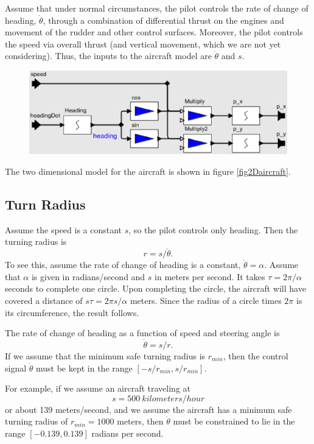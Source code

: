 \documentclass[11pt]{article}
\begin{document}
Assume that under normal circumstances, the pilot controls the rate of
change of heading, $\dot{\theta}$, through a combination of differential
thrust on the engines and movement of the rudder and other control
surfaces. Moreover, the pilot controls the speed via overall thrust
(and vertical movement, which we are not yet considering).
Thus, the inputs to the aircraft model are $\dot{\theta}$ and $s$.

\begin{figure}[btp]
\centering
\includegraphics[width=5in]{fig2Daircraft.eps}
\end{figure}

The two dimensional model for the aircraft is shown in figure
\ref{fig2Daircraft}.

\subsection{Turn Radius}

Assume the speed is a constant $s$, so the pilot controls only heading.
Then the turning radius is
\[
r = s/\dot{\theta} .
\]
To see this, assume the rate of change of heading is a constant,
$\dot{\theta} = \alpha$. Assume that $\alpha$ is given in radians/second and
$s$ in meters per second.  It takes $\tau = 2 \pi /\alpha$ seconds
to complete one circle.  Upon completing the circle, the aircraft
will have covered a distance of $s\tau = 2 \pi s/\alpha$ meters.
Since the radius of a circle times $2 \pi$ is its circumference,
the result follows.

The rate of change of heading as a function of speed and steering
angle is
\[
\dot{\theta} = s/r.
\]
If we assume that the minimum safe turning radius is $r_{min}$, then
the control signal $\dot{\theta}$ must be kept in the range
$[-s/r_{min}, s/r_{min}]$.

For example, if we assume an aircraft traveling at
\[
s = 500~ kilometers/hour
\]
or about 139 meters/second, and we assume the aircraft has a minimum
safe turning radius of $r_{min} = 1000$
meters, then $\dot{\theta}$ must be constrained
to lie in the range $[-0.139, 0.139]$ radians per second.
\end{document}
